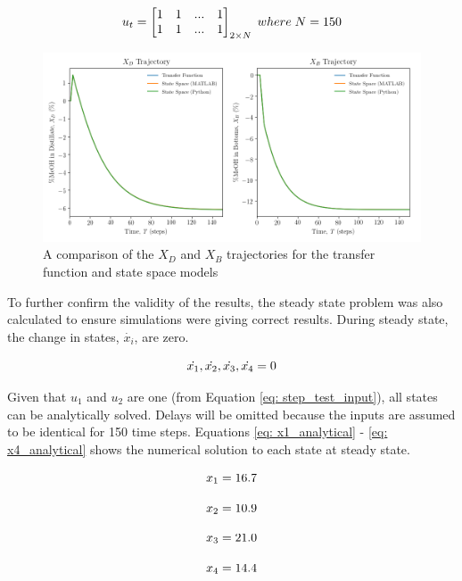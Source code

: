 \begin{equation}
    \centering
    u_t = 
    \begin{bmatrix}
        1  &  1  &  ...  &  1 \\
        1  &  1  &  ...  &  1
    \end{bmatrix}_{2 \times N}
    \; where \; N = 150
    \label{eq: step_test_input}
\end{equation}

\begin{figure}[h]
    \centering
    \includegraphics[scale=0.42]{images/step_test_plots.png}
    \caption{A comparison of the $X_D$ and $X_B$ trajectories for the transfer function and state space models}
    \label{fig: step_test_plots}
\end{figure}

To further confirm the validity of the results, the steady state problem was also calculated to ensure simulations were giving correct results. During steady state, the change in states, $\dot{x_i}$, are zero.

\begin{equation}
    \centering
    \dot{x_1}, \dot{x_2}, \dot{x_3}, \dot{x_4} = 0
\end{equation}

Given that $u_1$ and $u_2$ are one (from Equation \ref{eq: step_test_input}), all states can be analytically solved.  Delays will be omitted because the inputs are assumed to be identical for 150 time steps. Equations \ref{eq: x1_analytical} - \ref{eq: x4_analytical} shows the numerical solution to each state at steady state.

{
\begin{equation}
    \centering
    x_1 = 16.7
    \label{eq: x1_analytical}
\end{equation}

\begin{equation}
    \centering
    x_2 = 10.9
    \label{eq: x2_analytical}
\end{equation}

\begin{equation}
    \centering
    x_3 = 21.0
    \label{eq: x3_analytical}
\end{equation}

\begin{equation}
    \centering
    x_4 = 14.4
    \label{eq: x4_analytical}
\end{equation}
}

